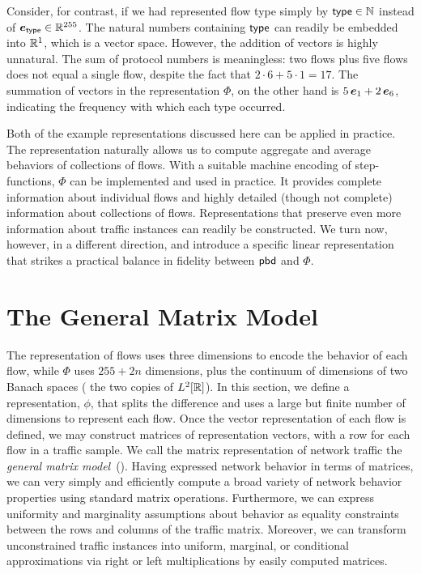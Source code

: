 \documentclass[twocolumn,final]{svjour3}
\begin{document}
Consider, for contrast, if we had represented flow type simply by $\text{\textsf{type}} \in \mathbb{N}$ instead of $\e_\type \in \R^{255}$.
The natural numbers containing $\text{\textsf{type}}$ can readily be embedded into $\mathbb{R}^1$, which is a vector space.
However, the addition of vectors is highly unnatural.
The sum of protocol numbers is meaningless:
two  flows plus five  flows does not equal a single  flow, despite the fact that $2\cdot6+5\cdot1=17$.
The summation of vectors in the representation $\Phi$, on the other hand is $5\,\e_1+2\,\e_6$, indicating the frequency with which each type occurred.

Both of the example representations discussed here can be applied in practice.
The  representation naturally allows us to compute aggregate and average  behaviors of collections of flows.
With a suitable machine encoding of step-functions, $\Phi$ can be implemented and used in practice.
It provides complete information about individual flows and highly detailed (though not complete) information about collections of flows.
Representations that preserve even more information about traffic instances can readily be constructed.
We turn now, however, in a different direction, and introduce a specific linear representation that strikes a practical balance in fidelity between $\text{\textsf{pbd}}$ and $\Phi$.

\section{The General Matrix Model}



The  representation of flows uses three dimensions to encode the behavior of each flow, while $\Phi$ uses $255+2n$ dimensions, plus the continuum of dimensions of two Banach spaces ( the two copies of $L^2[\mathbb{R}]$).
In this section, we define a representation, $\phi$, that splits the difference and uses a large but finite number of dimensions to represent each flow.
Once the vector representation of each flow is defined, we may construct matrices of representation vectors, with a row for each flow in a traffic sample.
We call the matrix representation of network traffic the \emph{general matrix model}~().
Having expressed network behavior in terms of matrices, we can very simply and efficiently compute a broad variety of network behavior properties using standard matrix operations.
Furthermore, we can express uniformity and marginality assumptions about behavior as equality constraints between the rows and columns of the traffic matrix.
Moreover, we can transform unconstrained traffic instances into uniform, marginal, or conditional approximations via right or left multiplications by easily computed matrices.
\end{document}
